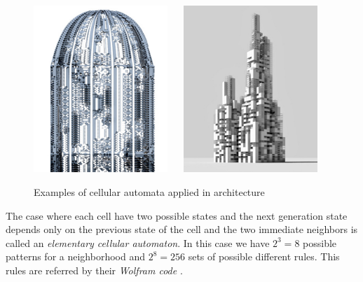 \begin{figure}
        \centering
                \includegraphics[width=0.45\textwidth]{images/Theory/Cellular_A/dome1.jpg}
          ~~
                \includegraphics[width=0.45\textwidth]{images/Theory/Cellular_A/main1.jpg}
        \caption{Examples of cellular automata applied in architecture}
        \label{fig:CAarchitecture}
\end{figure}

The case where each cell have two possible states and the next generation state depends only on the previous state of the cell and the two immediate neighbors is called an \emph{elementary cellular automaton}. In this case we have $2^3 = 8$ possible patterns for a neighborhood and $2^8 = 256$ sets of possible different rules. This rules are referred by their \emph{Wolfram code} \cite{CellularAutWOLFRAM}. 

